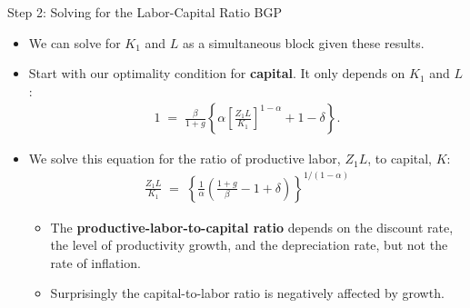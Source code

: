\documentclass[10pt,c,aspectratio=1610,handout]{beamer}
\begin{document}
\begin{frame}{Step 2: Solving for the Labor-Capital Ratio BGP}%
  \begin{itemize}%
    \item[$\blacktriangleright$] We can solve for $K_{1}$ and $L$ as a simultaneous block given these results.%
    \pause%
    \item[$\blacktriangleright$] Start with our optimality condition for \textbf{capital}. It only depends on $K_{1}$ and $L$:%
    \begin{align*}%
      1 \; = \; \frac{\beta}{1+g} \left\{ \alpha \left[ \frac{Z_{1} L }{K_{1}} \right]^{1-\alpha} + 1 - \delta \right\}.%
    \end{align*}%
    \vspace*{0.1in}%
    \pause%
    \item[$\blacktriangleright$] We solve this equation for the ratio of productive labor, $Z_1 L$, to capital, $K$:%
    \begin{align}%
      \frac{Z_{1} L}{K_{1}} \; = \; \left\{ \frac{1}{\alpha} \left( \frac{1 +g}{\beta} - 1 + \delta \right) \right\}^{1/(1 -\alpha)} \label{PrLtoKratio}%
    \end{align}%
    \vspace*{-0.1in}%
    \begin{itemize}%
      \item[$\rightarrow$] The \textbf{productive-labor-to-capital ratio} depends on the discount rate, the level of productivity growth, and the depreciation rate, but not the rate of inflation.%
      \item[$\rightarrow$] Surprisingly the capital-to-labor ratio is negatively affected by growth.%
    \end{itemize}%
  \end{itemize}%
\end{frame}%
\end{document}
